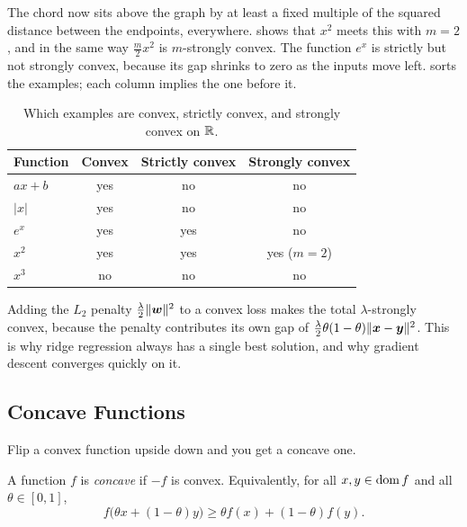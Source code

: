 The chord now sits above the graph by at least a fixed multiple of the
squared distance between the endpoints, everywhere. 
shows that $x^2$ meets this with $m = 2$, and in the same way
$\tfrac{m}{2} x^2$ is $m$-strongly convex. The function $e^x$ is strictly
but not strongly convex, because its gap shrinks to zero as the inputs
move left.  sorts the examples; each column
implies the one before it.

\begin{table}[ht]
  \centering
  \caption{Which examples are convex, strictly convex, and strongly
    convex on $\mathbb{R}$.}
  \label{tab:ch01-strict-strong}
  \begin{tabular}{@{}lccc@{}}
    \toprule
    Function & Convex & Strictly convex & Strongly convex \\
    \midrule
    $ax + b$ & yes & no & no \\
    $|x|$ & yes & no & no \\
    $e^x$ & yes & yes & no \\
    $x^2$ & yes & yes & yes ($m = 2$) \\
    $x^3$ & no & no & no \\
    \bottomrule
  \end{tabular}
\end{table}

\begin{aibox}
  Adding the $L_2$ penalty $\tfrac{\lambda}{2} \|\bm{w}\|^2$ to a convex
  loss makes the total $\lambda$-strongly convex, because the penalty
  contributes its own gap of $\tfrac{\lambda}{2} \theta (1 - \theta)
  \|\bm{x} - \bm{y}\|^2$. This is why ridge regression always has a
  single best solution, and why gradient descent converges quickly on
  it.
\end{aibox}

\subsection{Concave Functions}
\label{sec:ch01-concave}

Flip a convex function upside down and you get a concave one.

\begin{definition}
  \label{def:concave}
  A function $f$ is \emph{concave} if $-f$ is convex. Equivalently, for all
  $x, y \in \operatorname{dom} f$ and all $\theta \in [0, 1]$,
  \[
    f\bigl(\theta x + (1 - \theta) y\bigr) \ge \theta f(x) + (1 - \theta) f(y).
  \]
\end{definition}

